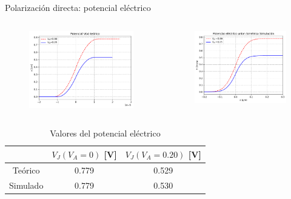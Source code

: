 \documentclass[aspectratio=169,xcolor=dvipsnames]{beamer}
\begin{document}
\begin{frame}{Polarización directa: potencial eléctrico}
    
    \begin{columns}
        \begin{column}{0.5\textwidth}
            \begin{figure}
                \includegraphics[width=0.90\linewidth]{Teorico/Potencial_Electrico-Directa.pdf}
            \end{figure}
        \end{column}
        \begin{column}{0.5\textwidth}
            \begin{figure}
                \includegraphics[width=0.90\linewidth]{Directa/Potencial_Electrico-Directa.pdf}
            \end{figure}
        \end{column}
        \end{columns}
        \begin{table}
            \caption{Valores del potencial eléctrico}
            \begin{tabular}{c|cc}
                & $V_J (V_A=0)$ [V] & $V_J (V_A=0.20)$ [V]  \\ \hline
                Teórico & 0.779  & 0.529 \\
                Simulado & 0.779  & 0.530 
            \end{tabular}
        \end{table}
\end{frame}
\end{document}
